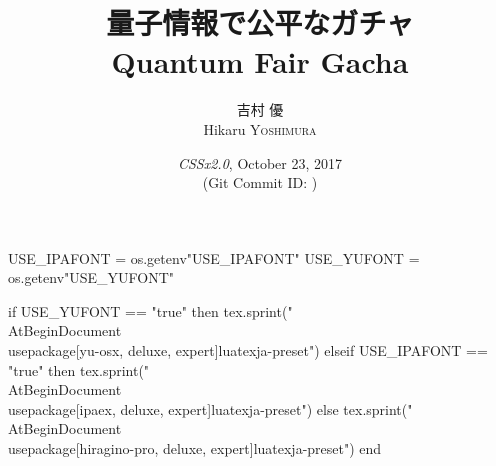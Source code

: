 \hypersetup{colorlinks,linkcolor=,urlcolor=links}

\beamertemplatenavigationsymbolsempty


\usepackage{luacode}
\usepackage{luatexja}
\usepackage{pgfpages}

\begin{luacode*}
  USE_IPAFONT = os.getenv"USE_IPAFONT"
  USE_YUFONT = os.getenv"USE_YUFONT"
  
  if USE_YUFONT == "true" then
    tex.sprint("\\AtBeginDocument{\\usepackage[yu-osx, deluxe, expert]{luatexja-preset}}")
  elseif USE_IPAFONT == "true" then
    tex.sprint("\\AtBeginDocument{\\usepackage[ipaex, deluxe, expert]{luatexja-preset}}")
  else
    tex.sprint("\\AtBeginDocument{\\usepackage[hiragino-pro, deluxe, expert]{luatexja-preset}}")
  end
\end{luacode*}

\usepackage{epigraph}
\usepackage{etoolbox}
\usepackage{tikz}
\usepackage{framed}
\usepackage[ss]{libertine}
\usepackage[libertine]{newtxmath}
\usepackage{amsmath}
\usepackage{mathtools}
\usepackage{braket}

\renewcommand{\kanjifamilydefault}{\gtdefault}


\setmonofont[Ligatures=TeX]{CMU Typewriter Text}



\title[量子情報で公平なガチャ]{%
  量子情報で公平なガチャ \\
  {\normalsize Quantum Fair Gacha} 
}
\author[吉村 優]{%
  吉村 優 \\
  Hikaru \textsc{Yoshimura}
}
\date[October 23, 2017]{%
   \textit{\rmfamily CSSx2.0}, October 23, 2017 \\%
  {\footnotesize (Git Commit ID: \GITAbrHash)}
}





